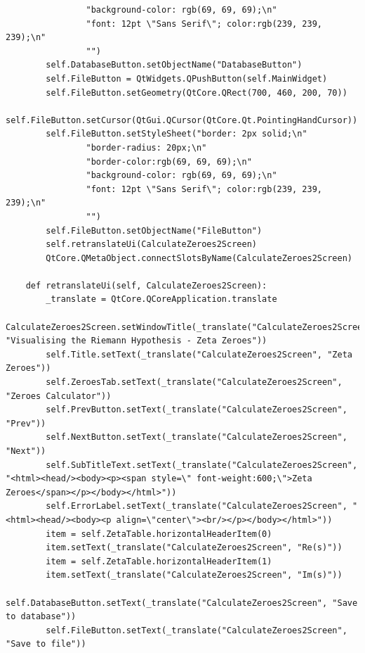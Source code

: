 \documentclass[12pt]{article}
\begin{document}
\begin{lstlisting}
                "background-color: rgb(69, 69, 69);\n"
                "font: 12pt \"Sans Serif\"; color:rgb(239, 239, 239);\n"
                "")
        self.DatabaseButton.setObjectName("DatabaseButton")
        self.FileButton = QtWidgets.QPushButton(self.MainWidget)
        self.FileButton.setGeometry(QtCore.QRect(700, 460, 200, 70))
        self.FileButton.setCursor(QtGui.QCursor(QtCore.Qt.PointingHandCursor))
        self.FileButton.setStyleSheet("border: 2px solid;\n"
                "border-radius: 20px;\n"
                "border-color:rgb(69, 69, 69);\n"
                "background-color: rgb(69, 69, 69);\n"
                "font: 12pt \"Sans Serif\"; color:rgb(239, 239, 239);\n"
                "")
        self.FileButton.setObjectName("FileButton")
        self.retranslateUi(CalculateZeroes2Screen)
        QtCore.QMetaObject.connectSlotsByName(CalculateZeroes2Screen)

    def retranslateUi(self, CalculateZeroes2Screen):
        _translate = QtCore.QCoreApplication.translate
        CalculateZeroes2Screen.setWindowTitle(_translate("CalculateZeroes2Screen", "Visualising the Riemann Hypothesis - Zeta Zeroes"))
        self.Title.setText(_translate("CalculateZeroes2Screen", "Zeta Zeroes"))
        self.ZeroesTab.setText(_translate("CalculateZeroes2Screen", "Zeroes Calculator"))
        self.PrevButton.setText(_translate("CalculateZeroes2Screen", "Prev"))
        self.NextButton.setText(_translate("CalculateZeroes2Screen", "Next"))
        self.SubTitleText.setText(_translate("CalculateZeroes2Screen", "<html><head/><body><p><span style=\" font-weight:600;\">Zeta Zeroes</span></p></body></html>"))
        self.ErrorLabel.setText(_translate("CalculateZeroes2Screen", "<html><head/><body><p align=\"center\"><br/></p></body></html>"))
        item = self.ZetaTable.horizontalHeaderItem(0)
        item.setText(_translate("CalculateZeroes2Screen", "Re(s)"))
        item = self.ZetaTable.horizontalHeaderItem(1)
        item.setText(_translate("CalculateZeroes2Screen", "Im(s)"))
        self.DatabaseButton.setText(_translate("CalculateZeroes2Screen", "Save to database"))
        self.FileButton.setText(_translate("CalculateZeroes2Screen", "Save to file"))
\end{lstlisting}
\end{document}
